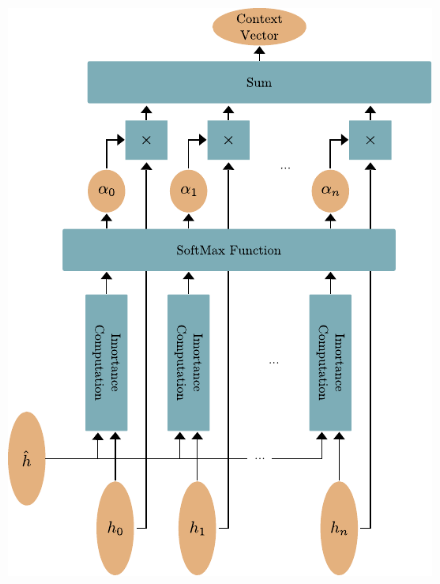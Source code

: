 \documentclass[]{marticle}
\begin{document}
\begin{figure}[!h] 
\begin{center}
\includegraphics{context_with_attention.pdf}
\caption{} 
\end{center}
\end{figure}
\end{document}
